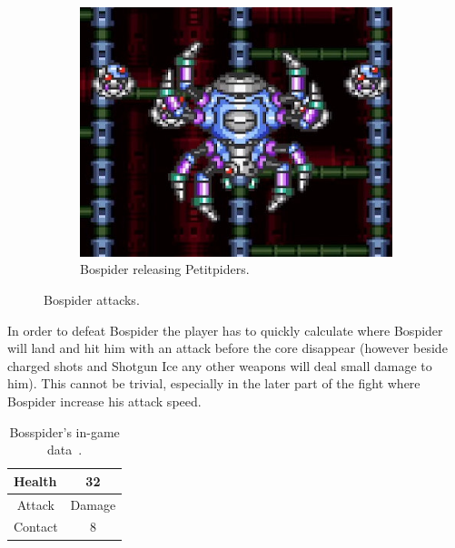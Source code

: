 \begin{figure}[htp]
\begin{subfigure}[t]{0.45\linewidth}
		\includegraphics[width=\linewidth]{figures/X1/Sigma_stages/Bospider_summon.jpg}
		\caption{Bospider releasing Petitpiders.}
	\end{subfigure}
	\caption{Bospider attacks.}
\end{figure} 
In order to defeat Bospider the player has to quickly calculate where Bospider will land and hit him with an attack before the core disappear (however beside charged shots and Shotgun Ice any other weapons will deal small damage to him). This cannot be trivial, especially in the later part of the fight where Bospider increase his attack speed.
\begin{table}
	\centering
	\begin{tabular}[h]{l c}
		\toprule
		Health  & 32\\
		\midrule
		\multicolumn{1}{c}{Attack} & \multicolumn{1}{c}{Damage}\\
		Contact & 8\\
		\bottomrule
	\end{tabular}
	\caption{Bosspider's in-game data~\cite{wiki:Bospider}. }
\end{table}



